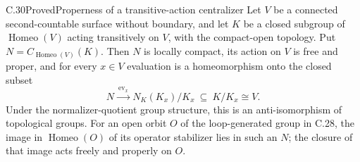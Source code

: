 \begin{claim}{C.30}{Proved}{Properness of a transitive-action centralizer}
Let $V$ be a connected second-countable surface without boundary,
and let $K$ be a closed subgroup of $\operatorname{Homeo}(V)$ acting
transitively on $V$, with the compact-open topology. Put
$N=C_{\operatorname{Homeo}(V)}(K)$. Then $N$ is locally compact,
its action on $V$ is free and proper, and for every $x\in V$
evaluation is a homeomorphism onto the closed subset
\[
 N\xrightarrow{\ \mathrm{ev}_x\ }
 N_K(K_x)/K_x\ \subseteq\ K/K_x\cong V.                  \tag{C.30.1}
\]
Under the normalizer-quotient group structure, this is an
anti-isomorphism of topological groups. For an open orbit $O$ of the
loop-generated group in C.28, the image in $\operatorname{Homeo}(O)$
of its operator stabilizer lies in such an $N$; the closure of that
image acts freely and properly on $O$.
\end{claim}
